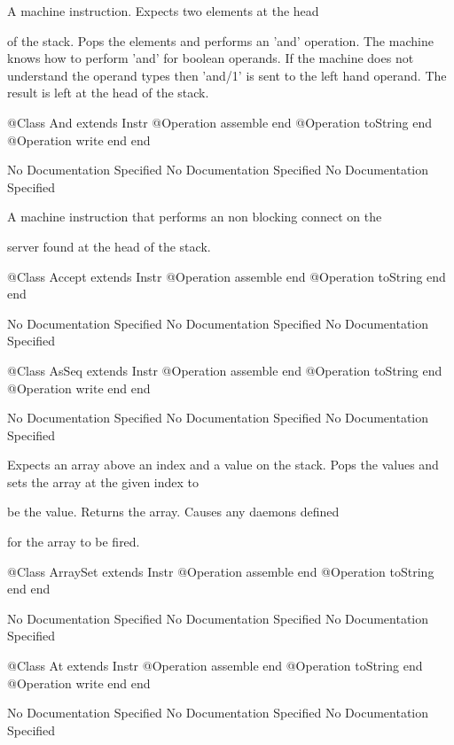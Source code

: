       A machine instruction. Expects two elements at the head

      of the stack. Pops the elements and performs an 'and' operation.
      The machine knows how to perform 'and' for boolean operands.
      If the machine does not understand the operand types then 'and/1' 
      is sent to the left hand operand. The result is left at the head 
      of the stack.
\begin{Interface}
@Class And extends Instr
  @Operation assemble end
  @Operation toString end
  @Operation write end
end
\end{Interface}
No Documentation Specified
No Documentation Specified
No Documentation Specified

     A machine instruction that performs an non blocking connect on the

     server found at the head of the stack.
\begin{Interface}
@Class Accept extends Instr
  @Operation assemble end
  @Operation toString end
end
\end{Interface}
No Documentation Specified
No Documentation Specified
No Documentation Specified
\begin{Interface}
@Class AsSeq extends Instr
  @Operation assemble end
  @Operation toString end
  @Operation write end
end
\end{Interface}
No Documentation Specified
No Documentation Specified
No Documentation Specified

      Expects an array above an index and a value on the stack. 
      Pops the values and sets the array at the given index to

      be the value. Returns the array. Causes any daemons defined

      for the array to be fired.
\begin{Interface}
@Class ArraySet extends Instr
  @Operation assemble end
  @Operation toString end
end
\end{Interface}
No Documentation Specified
No Documentation Specified
No Documentation Specified
\begin{Interface}
@Class At extends Instr
  @Operation assemble end
  @Operation toString end
  @Operation write end
end
\end{Interface}
No Documentation Specified
No Documentation Specified
No Documentation Specified

